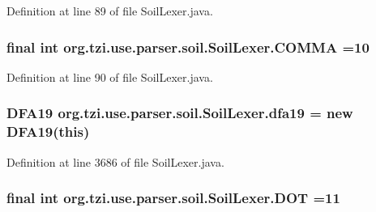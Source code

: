 Definition at line 89 of file Soil\-Lexer.\-java.

\hypertarget{classorg_1_1tzi_1_1use_1_1parser_1_1soil_1_1_soil_lexer_a775a15378d8e0dba9f116e3d275ef9e7}{
\subsubsection[{C\-O\-M\-M\-A}]{\setlength{\rightskip}{0pt plus 5cm}final int org.\-tzi.\-use.\-parser.\-soil.\-Soil\-Lexer.\-C\-O\-M\-M\-A =10\hspace{0.3cm}{\ttfamily [static]}}}\label{classorg_1_1tzi_1_1use_1_1parser_1_1soil_1_1_soil_lexer_a775a15378d8e0dba9f116e3d275ef9e7}


Definition at line 90 of file Soil\-Lexer.\-java.

\hypertarget{classorg_1_1tzi_1_1use_1_1parser_1_1soil_1_1_soil_lexer_a54cdbeac7b271433af9308f5b320b6ce}{
\subsubsection[{dfa19}]{\setlength{\rightskip}{0pt plus 5cm}D\-F\-A19 org.\-tzi.\-use.\-parser.\-soil.\-Soil\-Lexer.\-dfa19 = new D\-F\-A19(this)\hspace{0.3cm}{\ttfamily [protected]}}}\label{classorg_1_1tzi_1_1use_1_1parser_1_1soil_1_1_soil_lexer_a54cdbeac7b271433af9308f5b320b6ce}


Definition at line 3686 of file Soil\-Lexer.\-java.

\hypertarget{classorg_1_1tzi_1_1use_1_1parser_1_1soil_1_1_soil_lexer_a4c42c5bf6fbf6938c98172cd53fd5ff1}{
\subsubsection[{D\-O\-T}]{\setlength{\rightskip}{0pt plus 5cm}final int org.\-tzi.\-use.\-parser.\-soil.\-Soil\-Lexer.\-D\-O\-T =11\hspace{0.3cm}{\ttfamily [static]}}}\label{classorg_1_1tzi_1_1use_1_1parser_1_1soil_1_1_soil_lexer_a4c42c5bf6fbf6938c98172cd53fd5ff1}


